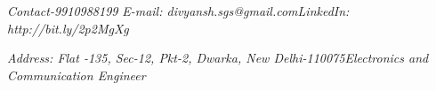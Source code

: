 \documentclass[11pt]{article}
\begin{document}
\textit{Contact-9910988199}                                                 \hspace{2.5cm}\textit{E-mail: divyansh.sgs@gmail.com}\hspace{2.5cm}\textit{LinkedIn: http://bit.ly/2p2MgXg}                           
\begin{mdframed}[backgroundcolor=orange]
\begin{flushright}
\begin{Huge}
\end{Huge}
\end{flushright}
\end{mdframed}

\textit{Address: Flat -135, Sec-12, Pkt-2, Dwarka, New Delhi-110075}\hspace{2.5cm}\textit{Electronics and Communication Engineer}
\end{document}
